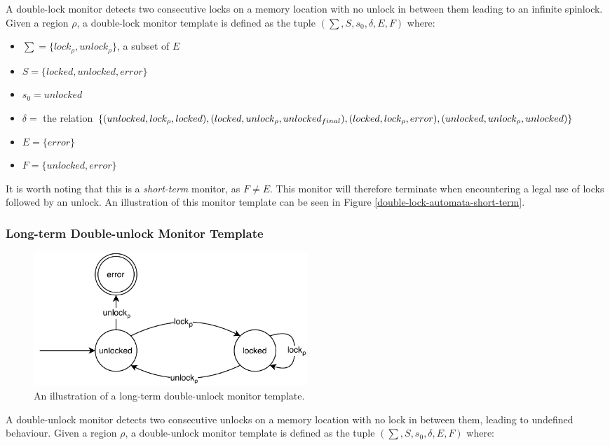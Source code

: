 A double-lock monitor detects two consecutive locks on a memory location with no unlock in between them leading to an infinite spinlock. Given a region $\rho$, a double-lock monitor template is defined as the tuple $(\sum, S, s_0, \delta, E, F)$ where: 

\begin{itemize}
    \item $\sum = \{lock_\rho, unlock_\rho\}$, a subset of $E$
    \item $S = \{ locked, unlocked, error \}$
    \item $s_0 = unlocked$ 
    \item $\delta =$ the relation $\{(unlocked, lock_\rho, locked), (locked, unlock_\rho, unlocked_{final}), \\
    (locked, lock_\rho, error), (unlocked, unlock_\rho, unlocked)\}$ 
    \item $E = \{ error \}$  
    \item $F = \{ unlocked, error \}$
\end{itemize}

\noindent It is worth noting that this is a \textit{short-term} monitor, as $F \neq E$. This monitor will therefore terminate when encountering a legal use of locks followed by an unlock. An illustration of this monitor template can be seen in Figure \ref{double-lock-automata-short-term}. 

\subsubsection*{Long-term Double-unlock Monitor Template}

\begin{figure}[H]
    \centering
    \includegraphics[width=0.5\textwidth]{algorithm/figures/double-unlock}
    \caption{An illustration of a long-term double-unlock monitor template.}
    \label{double-unlock-automata}
\end{figure}

A double-unlock monitor detects two consecutive unlocks on a memory location with no lock in between them, leading to undefined behaviour. Given a region $\rho$, a double-unlock monitor template is defined as the tuple $(\sum, S, s_0, \delta, E, F)$ where: 

